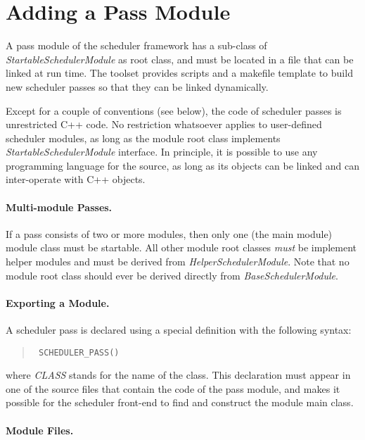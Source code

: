 \documentclass[a4paper,twoside]{tce}
\begin{document}
\section{Adding a Pass Module}
\label{ch:maintain:add-pass}

A pass module of the scheduler framework has a sub-class of
\emph{StartableSchedulerModule} as root class, and must be located in a file
that can be linked at run time.
%
The toolset provides scripts and a makefile template to build new scheduler
passes so that they can be linked dynamically.

Except for a couple of conventions (see below), the code of scheduler passes
is unrestricted C++ code.
%
No restriction whatsoever applies to user-defined scheduler modules, as long
as the module root class implements \emph{StartableSchedulerModule}
interface. In principle, it is possible to use any programming language for
the source, as long as its objects can be linked and can inter-operate with
C++ objects.

\paragraph{Multi-module Passes.}

If a pass consists of two or more modules, then only one (the main module)
module class must be startable. All other module root classes \emph{must} be
implement helper modules and must be derived from
\emph{HelperSchedulerModule}.
%
Note that no module root class should ever be derived directly from
\emph{BaseSchedulerModule}.

\paragraph{Exporting a Module.}

A scheduler pass is declared using a special definition with the following
syntax:
\begin{quote}\tt
  \verb|SCHEDULER_PASS|()
\end{quote}
where \emph{CLASS} stands for the name of the class. This declaration must
appear in one of the source files that contain the code of the pass module,
and makes it possible for the scheduler front-end to find and construct the
module main class.

\paragraph{Module Files.}
\end{document}
